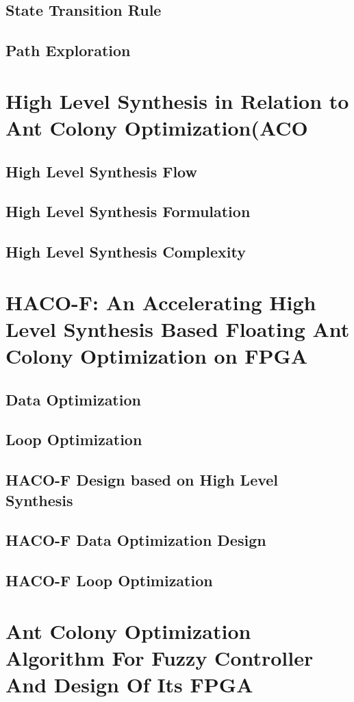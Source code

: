 \documentclass[conference]{IEEEtran}
\begin{document}
\subsection{State Transition Rule}
\subsection{Path Exploration}
\section{High Level Synthesis in Relation to Ant Colony Optimization(ACO}
\subsection{High Level Synthesis Flow}
\subsection{High Level Synthesis Formulation}
\subsection{High Level Synthesis Complexity}
\section{HACO-F: An Accelerating High Level Synthesis Based Floating Ant Colony Optimization on FPGA }
\subsection{Data Optimization}
\subsection{Loop Optimization }
\subsection{HACO-F Design based on High Level Synthesis}
\subsection{HACO-F Data Optimization Design}
\subsection{HACO-F Loop Optimization}
\section{Ant Colony Optimization Algorithm For Fuzzy Controller And Design Of Its FPGA}
\end{document}
